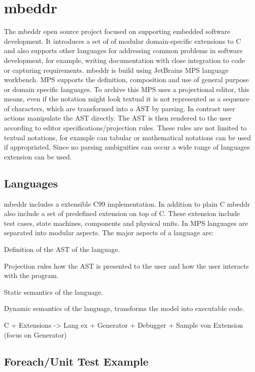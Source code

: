 \section{mbeddr}


The mbeddr open source project focused on supporting embedded software development. It introduces a set of of modular domain-specific extensions to C and also supports other languages for addressing common problems in software development, for example, writing documentation with close integration to code or capturing requirements. mbeddr is build using JetBrains \ac{MPS} language workbench. \ac{MPS} supports the definition, composition and use of general purpose or domain specific languages. To archive this \ac{MPS} uses a projectional editor, this means, even if the notation might look textual it is not represented as a sequence of characters, which are transformed into a \ac{AST} by parsing. In contrast user actions manipulate the \ac{AST} directly. The \ac{AST} is then rendered to the user according to editor specifications/projection rules. These rules are not limited to textual notations, for example can tabular or mathematical notations can be used if appropriated. Since no parsing ambiguities can occur a wide range of languages extension can be used.


\subsection{Languages}
\label{languageImplementation}
mbeddr includes a extensible C99 implementation. In addition to plain C mbeddr also include a set of predefined extension on top of C. These extension include test cases, state machines, components and physical units. In \ac{MPS} languages are separated into modular aspects. The major aspects of a language are:  

 Definition of the \ac{AST} of the language.

 Projection rules how the \ac{AST} is presented to the user and how the user interacts with the program.

 Static semantics of the language.
 
 Dynamic semantics of the language, transforms the model into executable code.


C + Extensions 
	    -> Lang ex +  Generator + Debugger
		+ Sample von Extension (focus on Generator)
		
\subsection{Foreach/Unit Test Example}
